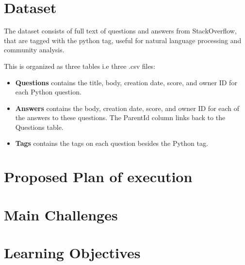 \documentclass{article}
\begin{document}
\section{Dataset}
The dataset consists of full text of questions and answers from StackOverflow, that are tagged with the python tag, useful for natural language processing and community analysis.  
\par
This is organized as three tables i.e three .csv files:
\begin{itemize}
\item \textbf{Questions} contains the title, body, creation date, score, and owner ID for each Python question.

\item \textbf{Answers}  contains the body, creation date, score, and owner ID for each of the answers to these questions. The ParentId column links back to the Questions table.

\item \textbf{Tags} contains the tags on each question besides the Python tag.
\end{itemize}




\section{Proposed Plan of execution}



\section{Main Challenges}


\section{Learning Objectives}
\end{document}

